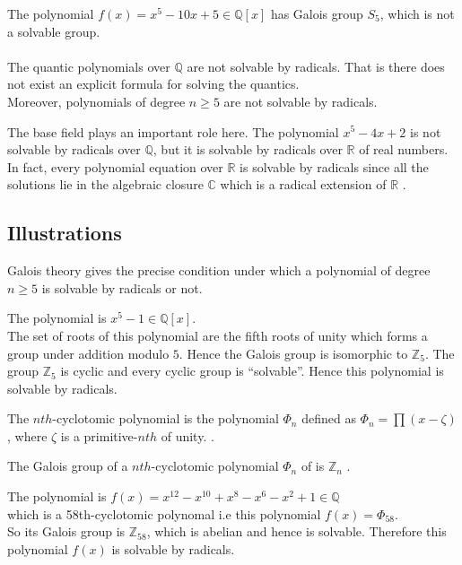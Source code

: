 The polynomial \(f(x)=x^5-10x+5 \in \mathbb{Q}[x]\) has Galois group \(S_5\), which is not a solvable group. \\ \\
The quantic polynomials over \(\mathbb{Q}\) are not solvable by radicals. That is there does not exist an explicit formula for solving the quantics. \\
Moreover, polynomials of degree \(n \geq 5\) are not solvable by radicals.

\begin{remark}
The base field plays an important role here. The polynomial \(x^5-4x+2\) is not solvable by radicals over \(\mathbb{Q}\), but it is solvable by radicals over \(\mathbb{R}\) of real numbers. In fact, every polynomial equation over \(\mathbb{R}\) is solvable by radicals since all the solutions lie in the algebraic closure \(\mathbb{C}\) which is a radical extension of \(\mathbb{R}\) \cite{hunger}.
\end{remark}

\vspace{5mm}
\subsection{Illustrations}
Galois theory gives the precise condition under which a polynomial of degree \(n \geq 5\) is solvable by radicals or not.

\vspace{3mm}
\begin{example}
  The polynomial is \(x^5-1 \in \mathbb{Q}[x]\).\\
  The set of  roots of this polynomial are the fifth roots of unity which forms a group under addition modulo \(5\). Hence the Galois group is isomorphic to \(\mathbb{Z}_5\). The group \(\mathbb{Z}_5\) is cyclic and every cyclic group is ``solvable''. Hence this polynomial is solvable by radicals.
\end{example}

\vspace{3mm}
\begin{definition}
  The \(nth\)-cyclotomic polynomial is the polynomial \({\Phi}_n\) defined as \({\Phi}_n= \prod {(x-\zeta)}\), where \(\zeta\) is a primitive-\(nth\) of unity. \cite{galois}.
\end{definition}

\vspace{3mm}
\begin{theorem}
  The Galois group of a \(nth\)-cyclotomic polynomial \({\Phi}_n\) of is \(\mathbb{Z}_n\) \cite{galois}.
\end{theorem}

\vspace{3mm}
\begin{example}
The polynomial is \(f(x)=x^{12}-x^{10}+x^8-x^6-x^2+1 \in \mathbb{Q}\)\\
which is a 58th-cyclotomic polynomal i.e this polynomial \(f(x)={\Phi}_{58}\).\\
  So its Galois group is \(\mathbb{Z}_{58}\), which is abelian and hence is solvable. Therefore this polynomial \(f(x)\) is solvable by radicals.
\end{example}
